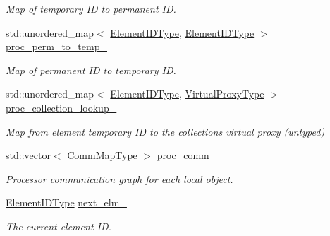 \begin{DoxyCompactItemize}
\begin{DoxyCompactList}\small\item\em Map of temporary ID to permanent ID. \end{DoxyCompactList}\item 
std\+::unordered\+\_\+map$<$ \hyperlink{namespacevt_1_1vrt_1_1collection_1_1balance_a14c8d2c972f2913aa3f1636e5be0a120}{Element\+I\+D\+Type}, \hyperlink{namespacevt_1_1vrt_1_1collection_1_1balance_a14c8d2c972f2913aa3f1636e5be0a120}{Element\+I\+D\+Type} $>$ \hyperlink{structvt_1_1vrt_1_1collection_1_1balance_1_1_proc_stats_a2812dc9eb7a995c67f9fade6d8b58799}{proc\+\_\+perm\+\_\+to\+\_\+temp\+\_\+}
\begin{DoxyCompactList}\small\item\em Map of permanent ID to temporary ID. \end{DoxyCompactList}\item 
std\+::unordered\+\_\+map$<$ \hyperlink{namespacevt_1_1vrt_1_1collection_1_1balance_a14c8d2c972f2913aa3f1636e5be0a120}{Element\+I\+D\+Type}, \hyperlink{namespacevt_a1b417dd5d684f045bb58a0ede70045ac}{Virtual\+Proxy\+Type} $>$ \hyperlink{structvt_1_1vrt_1_1collection_1_1balance_1_1_proc_stats_aacdd0003737c287b9ea4a981d9d152eb}{proc\+\_\+collection\+\_\+lookup\+\_\+}
\begin{DoxyCompactList}\small\item\em Map from element temporary ID to the collection\textquotesingle{}s virtual proxy (untyped) \end{DoxyCompactList}\item 
std\+::vector$<$ \hyperlink{namespacevt_1_1vrt_1_1collection_1_1balance_a10860c956804d644db54a16012352728}{Comm\+Map\+Type} $>$ \hyperlink{structvt_1_1vrt_1_1collection_1_1balance_1_1_proc_stats_a528f63fad3b42c387d0b38ba3c0eea11}{proc\+\_\+comm\+\_\+}
\begin{DoxyCompactList}\small\item\em Processor communication graph for each local object. \end{DoxyCompactList}\item 
\hyperlink{namespacevt_1_1vrt_1_1collection_1_1balance_a14c8d2c972f2913aa3f1636e5be0a120}{Element\+I\+D\+Type} \hyperlink{structvt_1_1vrt_1_1collection_1_1balance_1_1_proc_stats_a863634793fedcfefd22677b4ee943f8f}{next\+\_\+elm\+\_\+}
\begin{DoxyCompactList}\small\item\em The current element ID. \end{DoxyCompactList}\item 

\end{DoxyCompactItemize}
